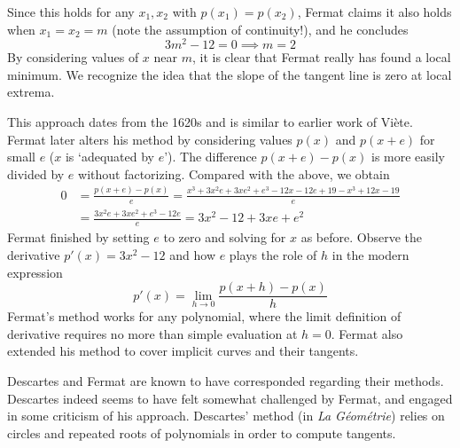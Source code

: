Since this holds for any $x_1,x_2$ with $p(x_1)=p(x_2)$, Fermat claims it also holds when $x_1=x_2=m$ (note the assumption of continuity!), and he concludes
\[
	3m^2-12=0\implies m=2
\]
By considering values of $x$ near $m$, it is clear that Fermat really has found a local minimum. We recognize the idea that the slope of the tangent line is zero at local extrema.
\smallbreak

This approach dates from the 1620s and is similar to earlier work of Viète. Fermat later alters his method by considering values $p(x)$ and $p(x+e)$ for small $e$ ($x$ is `adequated by $e$'). The difference $p(x+e)-p(x)$ is more easily divided by $e$ without factorizing. Compared with the above, we obtain
\begin{align*}
	0&=\frac{p(x+e)-p(x)}{e} =\frac{x^3+3x^2e+3xe^2+e^3-12x-12e+19-x^3+12x-19}{e}\\
	&=\frac{3x^2e+3xe^2+e^3-12e}{e} =3x^2-12 +3xe+e^2
\end{align*}
Fermat finished by setting $e$ to zero and solving for $x$ as before. Observe the derivative $p'(x)=3x^2-12$ and how $e$ plays the role of $h$ in the modern expression
\[
	p'(x)=\lim_{h\to 0}\frac{p(x+h)-p(x)}h
\]
Fermat's method works for any polynomial, where the limit definition of derivative requires no more than simple evaluation at $h=0$. Fermat also extended his method to cover implicit curves and their tangents.
\goodbreak


\label{pg:descartesnormal}

Descartes and Fermat are known to have corresponded regarding their methods. Descartes indeed seems to have felt somewhat challenged by Fermat, and engaged in some criticism of his approach. Descartes' method (in \emph{La Géométrie}) relies on circles and repeated roots of polynomials in order to compute tangents.\smallbreak

